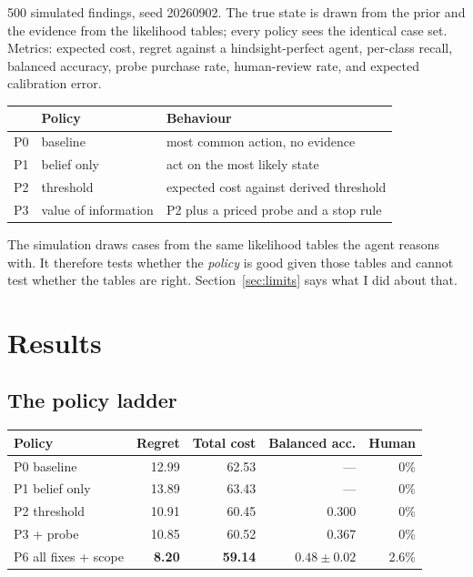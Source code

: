 \documentclass{article}
\begin{document}
500 simulated findings, seed 20260902. The true state is drawn from the prior and
the evidence from the likelihood tables; every policy sees the identical case
set. Metrics: expected cost, regret against a hindsight-perfect agent, per-class
recall, balanced accuracy, probe purchase rate, human-review rate, and expected
calibration error.

\begin{center}
\small
\begin{tabular}{@{}llp{4.4cm}@{}}
\toprule
& Policy & Behaviour \\
\midrule
P0 & baseline & most common action, no evidence \\
P1 & belief only & act on the most likely state \\
P2 & threshold & expected cost against derived threshold \\
P3 & value of information & P2 plus a priced probe and a stop rule \\
\bottomrule
\end{tabular}
\end{center}

The simulation draws cases from the same likelihood tables the agent reasons
with. It therefore tests whether the \emph{policy} is good given those tables and
cannot test whether the tables are right. Section~\ref{sec:limits} says what I
did about that.

\section{Results}
\label{sec:results}

\subsection{The policy ladder}

\begin{center}
\small
\begin{tabular}{@{}lrrrr@{}}
\toprule
Policy & Regret & Total cost & Balanced acc. & Human \\
\midrule
P0 baseline & 12.99 & 62.53 & --- & 0\% \\
P1 belief only & 13.89 & 63.43 & --- & 0\% \\
P2 threshold & 10.91 & 60.45 & 0.300 & 0\% \\
P3 + probe & 10.85 & 60.52 & 0.367 & 0\% \\
\midrule
P6 all fixes + scope & \textbf{8.20} & \textbf{59.14} & $0.48 \pm 0.02$ & 2.6\% \\
\bottomrule
\end{tabular}
\end{center}
\end{document}
